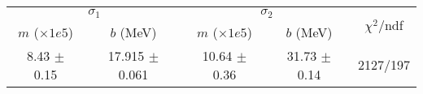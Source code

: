 \begin{tabular}{cc|cc||c}
\multicolumn{2}{c|}{$\sigma_1$} & \multicolumn{2}{|c}{$\sigma_2$}   & \multirow{2}{*}{$\chi^2/$ndf}\\
$m$ ($\times1e5$) & $b$ (MeV) & $m$ ($\times1e5$) & $b$ (MeV)  & \\
\hline
8.43 $\pm$ 0.15 & 17.915 $\pm$ 0.061 & 10.64 $\pm$ 0.36 & 31.73 $\pm$ 0.14 & 2127/197\\
\end{tabular}

